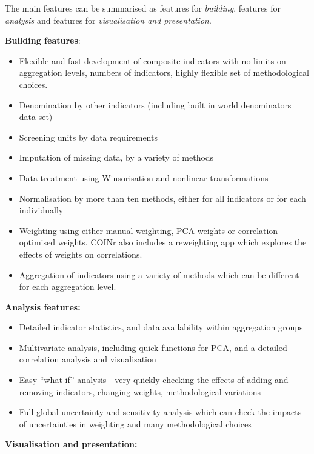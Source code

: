 \documentclass[
]{book}
\providecommand{\tightlist}{%
  \setlength{\itemsep}{0pt}\setlength{\parskip}{0pt}}
\begin{document}
The main features can be summarised as features for \emph{building}, features for \emph{analysis} and features for \emph{visualisation and presentation}.

\textbf{Building features}:

\begin{itemize}
\tightlist
\item
  Flexible and fast development of composite indicators with no limits on aggregation levels, numbers of indicators, highly flexible set of methodological choices.
\item
  Denomination by other indicators (including built in world denominators data set)
\item
  Screening units by data requirements
\item
  Imputation of missing data, by a variety of methods
\item
  Data treatment using Winsorisation and nonlinear transformations
\item
  Normalisation by more than ten methods, either for all indicators or for each individually
\item
  Weighting using either manual weighting, PCA weights or correlation optimised weights. COINr also includes a reweighting app which explores the effects of weights on correlations.
\item
  Aggregation of indicators using a variety of methods which can be different for each aggregation level.
\end{itemize}

\textbf{Analysis features:}

\begin{itemize}
\tightlist
\item
  Detailed indicator statistics, and data availability within aggregation groups
\item
  Multivariate analysis, including quick functions for PCA, and a detailed correlation analysis and visualisation
\item
  Easy ``what if'' analysis - very quickly checking the effects of adding and removing indicators, changing weights, methodological variations
\item
  Full global uncertainty and sensitivity analysis which can check the impacts of uncertainties in weighting and many methodological choices
\end{itemize}

\textbf{Visualisation and presentation:}
\end{document}
